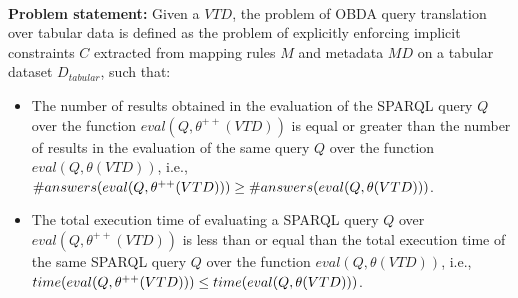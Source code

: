 \paragraph{}\noindent\textbf{Problem statement:} Given a $VTD$, the problem of OBDA query translation over tabular data is defined as the problem of explicitly enforcing implicit constraints $C$ extracted from mapping rules $M$ and metadata $MD$ on a tabular dataset $D_{tabular}$, such that: 
\begin{itemize}
    \item The number of results obtained in the evaluation of the SPARQL query $Q$ over the function $eval(Q,\theta^{++}(VTD))$ is equal or greater than the number of results in the evaluation of the same query $Q$ over the function $eval(Q,\theta(VTD))$, i.e., $\#answers(eval(Q,\theta^{++}(VTD))) \geq \\ \#answers(eval(Q,\theta(VTD)))$.
    \item The total execution time of evaluating a SPARQL query $Q$ over $eval(Q,\theta^{++}(VTD))$ is %
    less than or equal than the total execution time of the same SPARQL query $Q$ over the function $eval(Q,\theta(VTD))$, i.e.,\\ $time(eval(Q,\theta^{++}(VTD))) \leq \\
    time(eval(Q,\theta(VTD)))$. 
\end{itemize}


